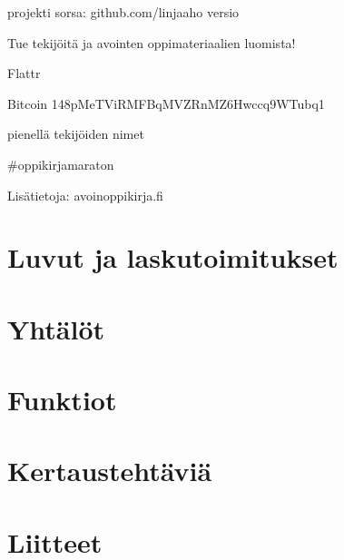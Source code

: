 
projekti
sorsa: github.com/linjaaho
versio


Tue tekijöitä ja avointen oppimateriaalien luomista!

Flattr

Bitcoin
148pMeTViRMFBqMVZRnMZ6Hwccq9WTubq1


pienellä tekijöiden nimet

\#oppikirjamaraton


Lisätietoja: avoinoppikirja.fi

\tableofcontents



\part{Luvut ja laskutoimitukset}
    
    
    
    
    
    
    
    
    

\part{Yhtälöt}
    
    
    
    
    
    
    
\part{Funktiot}
    
    
    
    
    

\part{Kertaustehtäviä}
    
    
    


\part*{Liitteet}
\appendix
    
    
    
    
    
    
    
    
